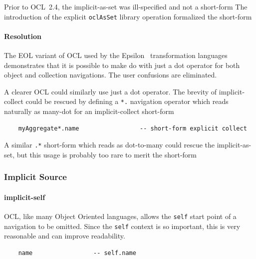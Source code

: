 \documentclass{jot}
\begin{document}
Prior to OCL~2.4, the implicit-as-set was ill-specified and not a short-form The introduction of the explicit \verb$oclAsSet$ library operation formalized the short-form

\paragraph{Resolution}

The EOL variant of OCL used by the Epsilon~\cite{Eclipse-Epsilon} transformation languages demonstrates that it is possible to make do with just a dot operator for both object and collection navigations. The user confusions are eliminated.

A clearer OCL could similarly use just a dot operator. The brevity of implicit-collect could be rescued by defining a \verb$*.$ navigation operator which reads naturally as many-dot for an implicit-collect short-form

\begin{verbatim}
    myAggregate*.name                 -- short-form explicit collect
\end{verbatim}

A similar \verb$.*$ short-form which reads as dot-to-many could rescue the implicit-as-set, but this usage is probably too rare to merit the short-form



\subsubsection{Implicit Source}

\paragraph{implicit-self} OCL, like many Object Oriented languages, allows the \verb$self$ start point of a navigation to be omitted. Since the \verb$self$ context is so important, this is very reasonable and can improve readability.

\begin{verbatim}
    name                 -- self.name
\end{verbatim}
\end{document}
